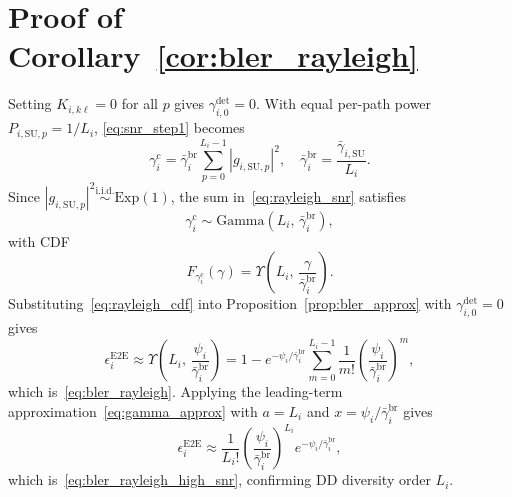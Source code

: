 \documentclass[journal]{IEEEtran}
\begin{document}
\section{Proof of Corollary~\ref{cor:bler_rayleigh}}
\label{app:proof_bler_rayleigh}
Setting $K_{i,k\ell}=0$ for all $p$ gives $\gamma_{i,0}^{\mathrm{det}}=0$. With equal per-path power $P_{i,\mathrm{SU},p}=1/L_i$, \eqref{eq:snr_step1} becomes
\begin{equation}
\gamma_i^{\mathrm{c}}=\bar{\gamma}_{i}^{\mathrm{br}}\sum_{p=0}^{L_i-1}|g_{i,\mathrm{SU},p}|^2,\quad\bar{\gamma}_{i}^{\mathrm{br}}=\frac{\bar{\gamma}_{i,\mathrm{SU}}}{L_i}.
\label{eq:rayleigh_snr}
\end{equation}
Since $|g_{i,\mathrm{SU},p}|^2\overset{\mathrm{i.i.d.}}{\sim}\mathrm{Exp}(1)$, the sum in~\eqref{eq:rayleigh_snr} satisfies
\begin{equation}
\gamma_i^{\mathrm{c}}\sim\mathrm{Gamma}\!\left(L_i,\,\bar{\gamma}_{i}^{\mathrm{br}}\right),
\end{equation}
with CDF
\begin{equation}
F_{\gamma_i^{\mathrm{c}}}(\gamma)=\Upsilon\!\left(L_i,\,\frac{\gamma}{\bar{\gamma}_{i}^{\mathrm{br}}}\right).
\label{eq:rayleigh_cdf}
\end{equation}
Substituting~\eqref{eq:rayleigh_cdf} into Proposition~\ref{prop:bler_approx} with $\gamma_{i,0}^{\mathrm{det}}=0$ gives
\begin{equation}
\epsilon_i^{\mathrm{E2E}}\approx\Upsilon\!\left(L_i,\,\frac{\psi_i}{\bar{\gamma}_{i}^{\mathrm{br}}}\right)=1-e^{-\psi_i/\bar{\gamma}_{i}^{\mathrm{br}}}\sum_{m=0}^{L_i-1}\frac{1}{m!}\left(\frac{\psi_i}{\bar{\gamma}_{i}^{\mathrm{br}}}\right)^{\!m},
\end{equation}
which is~\eqref{eq:bler_rayleigh}. Applying the leading-term approximation~\eqref{eq:gamma_approx} with $a=L_i$ and $x=\psi_i/\bar{\gamma}_{i}^{\mathrm{br}}$ gives
\begin{equation}
\epsilon_i^{\mathrm{E2E}}\approx\frac{1}{L_i!}\left(\frac{\psi_i}{\bar{\gamma}_{i}^{\mathrm{br}}}\right)^{\!L_i}e^{-\psi_i/\bar{\gamma}_{i}^{\mathrm{br}}},
\end{equation}
which is~\eqref{eq:bler_rayleigh_high_snr}, confirming DD diversity order $L_i$.
\end{document}
